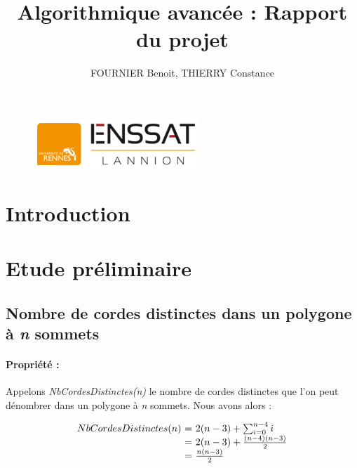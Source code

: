 \documentclass[a4paper,10pt]{article}
\title{Algorithmique avancée : Rapport du projet}
\author{FOURNIER Benoit, THIERRY Constance}
\begin{document}
\maketitle

\begin{figure}[b]
\begin{center}
\includegraphics[scale=1]{Enssat.png}
\end{center}
\end{figure}

\thispagestyle{empty}

\newpage
\null
\thispagestyle{empty}
\newpage

\tableofcontents

\hfill

\listoffigures

\newpage
\null
\thispagestyle{empty}
\newpage

\section{Introduction}

\section{Etude préliminaire}

\subsection{Nombre de cordes distinctes dans un polygone à \emph{n} sommets}

\paragraph{Propriété :}
Appelons \emph{NbCordesDistinctes(n)} le nombre de cordes distinctes que l'on peut dénombrer dans un polygone à \emph{n} sommets.
Nous avons alors :

\begin{equation} 
\begin{array}{r @{=} l}
NbCordesDistinctes(n) \ & \ 2(n-3) + \sum_{i=0}^{n-4} i \\
		      & \ 2(n-3) + \frac{(n-4)(n-3)}{2} \\
		      & \ \frac{n(n-3)}{2}
\end{array} 
\end{equation}
\end{document}
